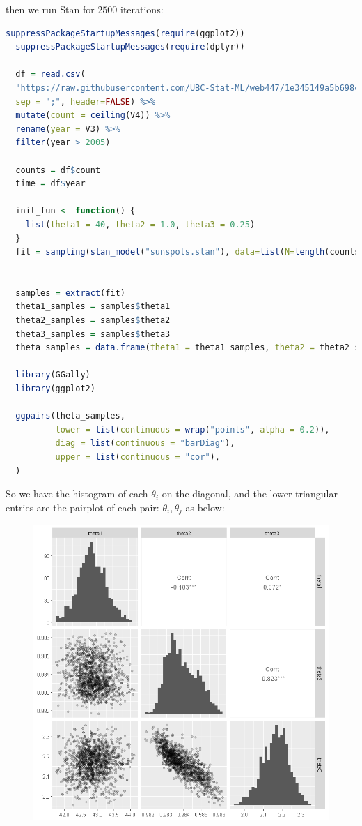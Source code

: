 \documentclass{article}
\begin{document}
then we run Stan for $2500$ iterations:
\begin{lstlisting}[language=R]
  suppressPackageStartupMessages(require(ggplot2))
  suppressPackageStartupMessages(require(dplyr))

  df = read.csv(
  "https://raw.githubusercontent.com/UBC-Stat-ML/web447/1e345149a5b698ccdf0a7e9b0aeabec2463c50ca/data/sunspots-SN_m_tot_V2.0.csv",
  sep = ";", header=FALSE) %>%
  mutate(count = ceiling(V4)) %>%
  rename(year = V3) %>%
  filter(year > 2005)

  counts = df$count 
  time = df$year

  init_fun <- function() {
    list(theta1 = 40, theta2 = 1.0, theta3 = 0.25)
  }
  fit = sampling(stan_model("sunspots.stan"), data=list(N=length(counts), y=counts, t=time), chains=1, iter=2500, init = init_fun, control = list(max_treedepth = 15))


  samples = extract(fit)
  theta1_samples = samples$theta1
  theta2_samples = samples$theta2
  theta3_samples = samples$theta3
  theta_samples = data.frame(theta1 = theta1_samples, theta2 = theta2_samples, theta3 = theta3_samples)

  library(GGally)
  library(ggplot2)

  ggpairs(theta_samples, 
          lower = list(continuous = wrap("points", alpha = 0.2)),
          diag = list(continuous = "barDiag"),
          upper = list(continuous = "cor"),
  )
\end{lstlisting}
So we have the histogram of each $\theta_i$ on the diagonal, and the lower triangular entries are the pairplot of each pair: $\theta_i, \theta_j$ as below:
\begin{figure}[H]
  \centering
  \includegraphics[width=\textwidth]{pairplot.png}
  \caption{}
  \label{}
\end{figure}
\end{document}

